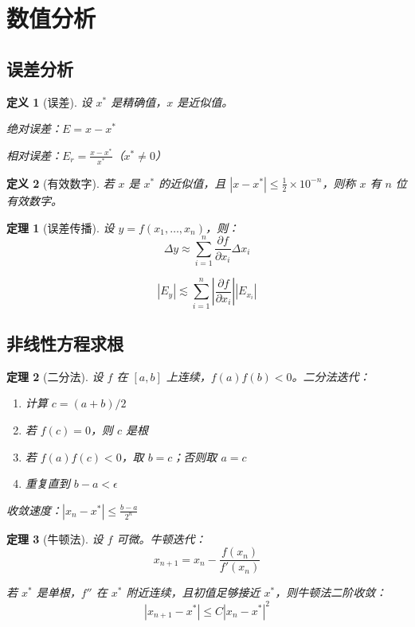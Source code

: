 \documentclass[12pt]{article}
\newtheorem{theorem}{定理}[section]
\newtheorem{definition}{定义}[section]
\begin{document}

\section{数值分析}

\subsection{误差分析}

\begin{definition}[误差]
设 $x^*$ 是精确值，$x$ 是近似值。

绝对误差：$E = x - x^*$

相对误差：$E_r = \frac{x - x^*}{x^*}$（$x^* \neq 0$）
\end{definition}

\begin{definition}[有效数字]
若 $x$ 是 $x^*$ 的近似值，且 $|x - x^*| \leq \frac{1}{2} \times 10^{-n}$，则称 $x$ 有 $n$ 位有效数字。
\end{definition}

\begin{theorem}[误差传播]
设 $y = f(x_1, \ldots, x_n)$，则：
$$\Delta y \approx \sum_{i=1}^{n} \frac{\partial f}{\partial x_i} \Delta x_i$$

$$|E_y| \lesssim \sum_{i=1}^{n} \left|\frac{\partial f}{\partial x_i}\right| |E_{x_i}|$$
\end{theorem}

\subsection{非线性方程求根}

\begin{theorem}[二分法]
设 $f$ 在 $[a, b]$ 上连续，$f(a)f(b) < 0$。二分法迭代：
\begin{enumerate}
\item 计算 $c = (a + b)/2$
\item 若 $f(c) = 0$，则 $c$ 是根
\item 若 $f(a)f(c) < 0$，取 $b = c$；否则取 $a = c$
\item 重复直到 $b - a < \epsilon$
\end{enumerate}

收敛速度：$|x_n - x^*| \leq \frac{b - a}{2^n}$
\end{theorem}

\begin{theorem}[牛顿法]
设 $f$ 可微。牛顿迭代：
$$x_{n+1} = x_n - \frac{f(x_n)}{f'(x_n)}$$

若 $x^*$ 是单根，$f''$ 在 $x^*$ 附近连续，且初值足够接近 $x^*$，则牛顿法二阶收敛：
$$|x_{n+1} - x^*| \leq C|x_n - x^*|^2$$
\end{theorem}
\end{document}
